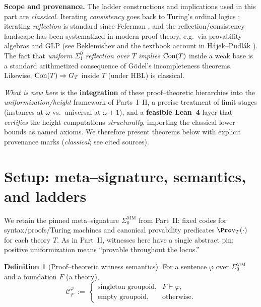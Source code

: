 \documentclass[11pt]{article}
\theoremstyle{definition}
\newtheorem{definition}[theorem]{Definition}
\theoremstyle{remark}
\begin{document}
\begin{mdframed}[style=status]
\textbf{Scope and provenance.}
The ladder constructions and implications used in this part are \emph{classical}.
Iterating \emph{consistency} goes back to Turing's ordinal logics \cite{Turing1939};
iterating \emph{reflection} is standard since Feferman \cite{Feferman1962}, and the
reflection/consistency landscape has been systematized in modern proof theory,
e.g.\ via provability algebras and GLP (see Beklemishev \cite{Beklemishev2003,Beklemishev2004}
and the textbook account in H\'ajek--Pudl\'ak \cite{HajekPudlak}).
The fact that \emph{uniform $\Sigma^0_1$ reflection over $T$ implies $\mathrm{Con}(T)$}
inside a weak base is a standard arithmetized consequence of G\"odel's incompleteness theorems.
Likewise, \(\mathrm{Con}(T)\Rightarrow G_T\) inside \(T\) (under HBL) is classical.
%
\smallskip

\emph{What is new here} is the \textbf{integration} of these proof--theoretic
hierarchies into the \emph{uniformization/height} framework of Parts~I--II,
a precise treatment of limit stages (instances at \(\omega\) vs.\ universal at
\(\omega{+}1\)), and a \textbf{feasible Lean~4} layer that \emph{certifies} the
height computations \emph{structurally}, importing the classical lower bounds as
named axioms. We therefore present theorems below with explicit provenance marks
(\emph{classical}; see cited sources).
\end{mdframed}

\section{Setup: meta--signature, semantics, and ladders}

We retain the pinned meta--signature \(\Sigma_0^{\mathrm{MM}}\) from Part~II:
fixed codes for syntax/proofs/Turing machines and canonical provability predicates
\(\Prov_T(\cdot)\) for each theory \(T\). As in Part~II, witnesses here have a single
abstract pin; positive uniformization means ``provable throughout the locus.''

\begin{definition}[Proof--theoretic witness semantics]
For a sentence \(\varphi\) over \(\Sigma_0^{\mathrm{MM}}\) and a foundation \(F\) (a theory),
\[
\mathcal C^\varphi_F \ :=\
\begin{cases}
\text{singleton groupoid}, & F\vdash \varphi,\\
\text{empty groupoid}, & \text{otherwise.}
\end{cases}
\]
\end{definition}
\end{document}
